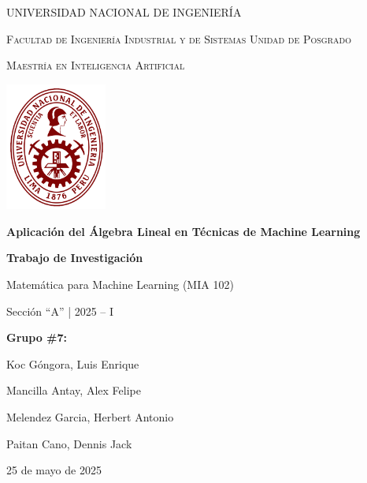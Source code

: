 \documentclass[12pt]{article}
\begin{document}
        
        \begin{titlepage}
                \centering
                {\scshape\Large UNIVERSIDAD NACIONAL DE INGENIERÍA \par}
                {\scshape\large Facultad de Ingeniería Industrial y de Sistemas Unidad de Posgrado \par}
                {\scshape\large Maestría en Inteligencia Artificial \par}
                \vspace{2cm}
                
                \includegraphics[width=0.25\textwidth]{imagenes/logo.png}\par\vspace{1cm}
                
                {\Huge\bfseries Aplicación del Álgebra Lineal en Técnicas de Machine Learning \par}
                \vspace{1.5cm}
                {\large\bfseries Trabajo de Investigación \par}
                \vspace{0.5cm}
                {\large Matemática para Machine Learning (MIA 102) \par}
                {\large Sección “A” | 2025 – I \par}
                \vspace{0.5cm}
                {\large\bfseries Grupo \#7: \par}
                \vspace{0.5cm}
                {\large Koc Góngora, Luis Enrique \par}
                {\large Mancilla Antay, Alex Felipe \par}
                {\large Melendez Garcia, Herbert Antonio \par}
                {\large Paitan Cano, Dennis Jack \par}
                \vfill
                {\large 25 de mayo de 2025 \par}
        \end{titlepage}
        
\end{document}
